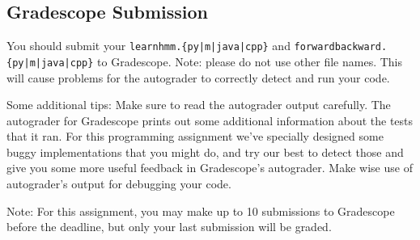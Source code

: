 \documentclass[11pt,addpoints,answers]{exam}
\numberwithin{equation}{section} %
\numberwithin{figure}{section} %
\numberwithin{table}{section} %
\begin{document}
\subsection{Gradescope Submission}

You should submit your \texttt{learnhmm.\{py|m|java|cpp\}} and %
\texttt{forwardbackward.\{py|m|java|cpp\}} to Gradescope.
Note: please do not use other file names. This will cause problems for the autograder to correctly detect and run your code.

Some additional tips: 
Make sure to read the autograder output carefully. The autograder for Gradescope prints out some additional 
information about the tests that it ran. For this programming assignment we've specially designed some buggy implementations that you might do, and try our best to detect those and give you some more useful feedback in Gradescope's autograder. Make wise use of autograder's output for debugging your code. 

Note: For this assignment, you may make up to 10 submissions to Gradescope before the deadline, but only your last submission will be graded.
   
    
\end{document}
